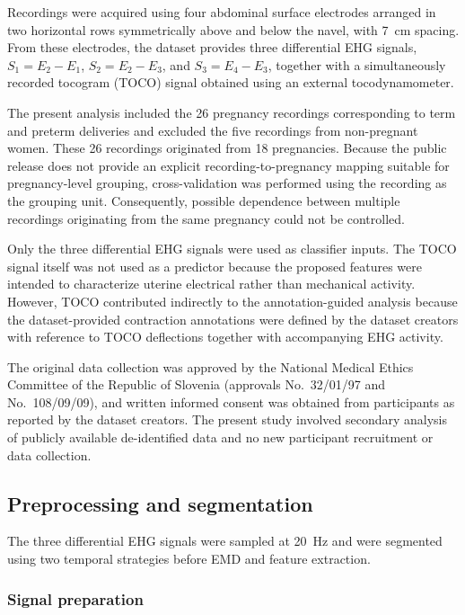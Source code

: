 \documentclass[10pt,letterpaper]{article}
\begin{document}
Recordings were acquired using four abdominal surface electrodes arranged in two horizontal rows symmetrically above and below the navel, with 7~cm spacing. From these electrodes, the dataset provides three differential EHG signals, $S_1 = E_2-E_1$, $S_2 = E_2-E_3$, and $S_3 = E_4-E_3$, together with a simultaneously recorded tocogram (TOCO) signal obtained using an external tocodynamometer.

The present analysis included the 26 pregnancy recordings corresponding to term and preterm deliveries and excluded the five recordings from non-pregnant women. These 26 recordings originated from 18 pregnancies. Because the public release does not provide an explicit recording-to-pregnancy mapping suitable for pregnancy-level grouping, cross-validation was performed using the recording as the grouping unit. Consequently, possible dependence between multiple recordings originating from the same pregnancy could not be controlled.

Only the three differential EHG signals were used as classifier inputs. The TOCO signal itself was not used as a predictor because the proposed features were intended to characterize uterine electrical rather than mechanical activity. However, TOCO contributed indirectly to the annotation-guided analysis because the dataset-provided contraction annotations were defined by the dataset creators with reference to TOCO deflections together with accompanying EHG activity.

The original data collection was approved by the National Medical Ethics Committee of the Republic of Slovenia (approvals No.~32/01/97 and No.~108/09/09), and written informed consent was obtained from participants as reported by the dataset creators. The present study involved secondary analysis of publicly available de-identified data and no new participant recruitment or data collection.

\subsection*{Preprocessing and segmentation}

The three differential EHG signals were sampled at 20~Hz and were segmented using two temporal strategies before EMD and feature extraction.

\subsubsection*{Signal preparation}
\end{document}
